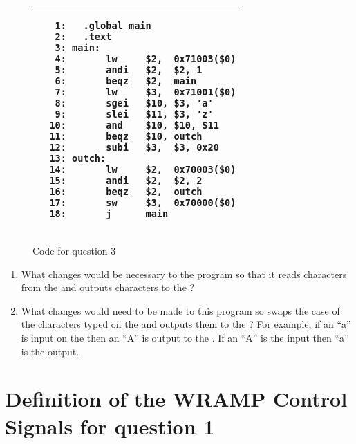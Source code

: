 \documentclass[a4paper,10pt]{article}
\begin{document}
\begin{enumerate}
\begin{figure}[h]
\begin{small}
\begin{center}
\begin{tabular}{|p{6cm}|}
\hline
\begin{verbatim}
   1:	.global main
   2:	.text
   3: main:
   4:       lw     $2,  0x71003($0)
   5:       andi   $2,  $2, 1
   6:       beqz   $2,  main
   7:       lw     $3,  0x71001($0)
   8:       sgei   $10, $3, 'a'
   9:       slei   $11, $3, 'z'
  10:       and    $10, $10, $11
  11:       beqz   $10, outch
  12:       subi   $3,  $3, 0x20
  13: outch:	  	
  14:       lw     $2,  0x70003($0)
  15:       andi   $2,  $2, 2
  16:       beqz   $2,  outch
  17:       sw     $3,  0x70000($0)
  18:       j      main
\end{verbatim}
\\
\hline
\end{tabular}
\end{center}
\end{small}
\caption{Code for question 3}
\label{q2_prog}
\end{figure}

\begin{enumerate} %


\item What changes would be necessary to the program so that it reads
characters from the  and outputs characters to the
 ?


\item What changes would need to be made to this program so swaps the
case of the characters typed on the  and outputs them
to the ? For example, if an ``a'' is input on the
 then an ``A'' is output to the . If an ``A'' is the input then ``a'' is the output.



\end{enumerate}

\end{enumerate}



\appendix
\newpage

\section{Definition of the WRAMP Control Signals for question 1} 
\label{cntrl_sig_defn}
\end{document}
